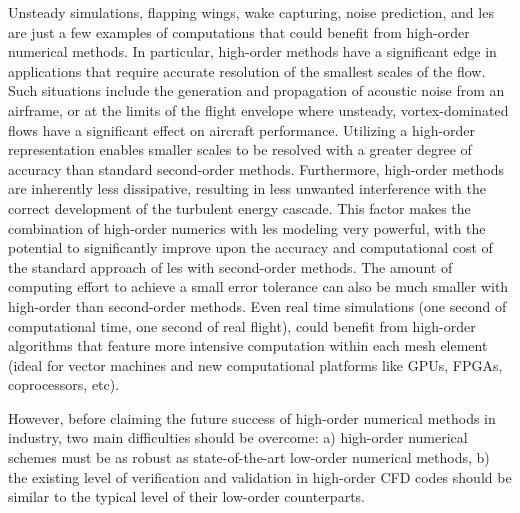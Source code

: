 Unsteady simulations, flapping wings, wake capturing, noise prediction, and \gls{les} are just a few examples of computations that could benefit from high-order numerical methods. In particular, high-order methods have a significant edge in applications that require accurate resolution of the smallest scales of the flow. Such situations include the generation and propagation of acoustic noise from an airframe, or at the limits of the flight envelope where unsteady, vortex-dominated flows have a significant effect on aircraft performance. Utilizing a high-order representation enables smaller scales to be resolved with a greater degree of accuracy than standard second-order methods. Furthermore, high-order methods are inherently less dissipative, resulting in less unwanted interference with the correct development of the turbulent energy cascade. This factor makes the combination of high-order numerics with \gls{les} modeling very powerful, with the potential to significantly improve upon the accuracy and computational cost of the standard approach of \gls{les} with second-order methods. The amount of computing effort to achieve a small error tolerance can also be much smaller with high-order than second-order methods. Even real time simulations (one second of computational time, one second of real flight), could benefit from high-order algorithms that feature more intensive computation within each mesh element (ideal for vector machines and new computational platforms like GPUs, FPGAs, coprocessors, etc).

However, before claiming the future success of high-order numerical methods in industry, two main difficulties should be overcome: a) high-order numerical schemes must be as robust as state-of-the-art low-order numerical methods, b) the existing level of verification and validation in high-order CFD codes should be similar to the typical level of their low-order counterparts.